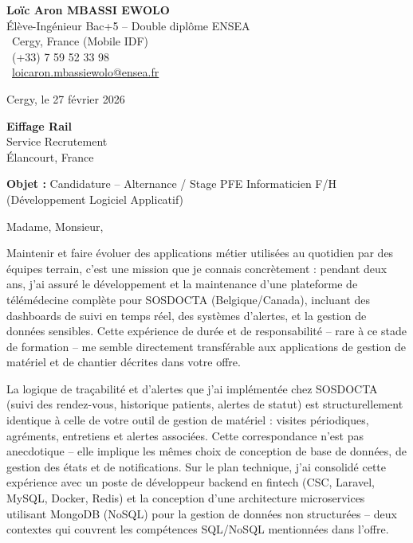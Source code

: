 \documentclass[a4paper,11pt]{article}
\begin{document}
\noindent
\begin{minipage}[t]{0.5\textwidth}
    \textbf{Loïc Aron MBASSI EWOLO}\\
    Élève-Ingénieur Bac+5 -- Double diplôme ENSEA\\[3pt]
    \faMapMarker\ Cergy, France (Mobile IDF)\\
    \faPhone\ (+33) 7 59 52 33 98\\
    \faEnvelope\ \href{mailto:loicaron.mbassiewolo@ensea.fr}{loicaron.mbassiewolo@ensea.fr}
\end{minipage}
\hfill
\begin{minipage}[t]{0.4\textwidth}
    \raggedleft
    Cergy, le 27 février 2026
\end{minipage}

\vspace{1.2cm}

\hfill
\begin{minipage}[t]{0.5\textwidth}
    \raggedleft
    \textbf{Eiffage Rail}\\
    Service Recrutement\\
    Élancourt, France
\end{minipage}

\vspace{1cm}

\noindent\textbf{Objet :} Candidature -- Alternance / Stage PFE Informaticien F/H (Développement Logiciel Applicatif)

\vspace{0.8cm}

Madame, Monsieur,

Maintenir et faire évoluer des applications métier utilisées au quotidien par des équipes terrain, c'est une mission que je connais concrètement : pendant deux ans, j'ai assuré le développement et la maintenance d'une plateforme de télémédecine complète pour SOSDOCTA (Belgique/Canada), incluant des dashboards de suivi en temps réel, des systèmes d'alertes, et la gestion de données sensibles. Cette expérience de durée et de responsabilité -- rare à ce stade de formation -- me semble directement transférable aux applications de gestion de matériel et de chantier décrites dans votre offre.

La logique de traçabilité et d'alertes que j'ai implémentée chez SOSDOCTA (suivi des rendez-vous, historique patients, alertes de statut) est structurellement identique à celle de votre outil de gestion de matériel : visites périodiques, agréments, entretiens et alertes associées. Cette correspondance n'est pas anecdotique -- elle implique les mêmes choix de conception de base de données, de gestion des états et de notifications. Sur le plan technique, j'ai consolidé cette expérience avec un poste de développeur backend en fintech (CSC, Laravel, MySQL, Docker, Redis) et la conception d'une architecture microservices utilisant MongoDB (NoSQL) pour la gestion de données non structurées -- deux contextes qui couvrent les compétences SQL/NoSQL mentionnées dans l'offre.
\end{document}
